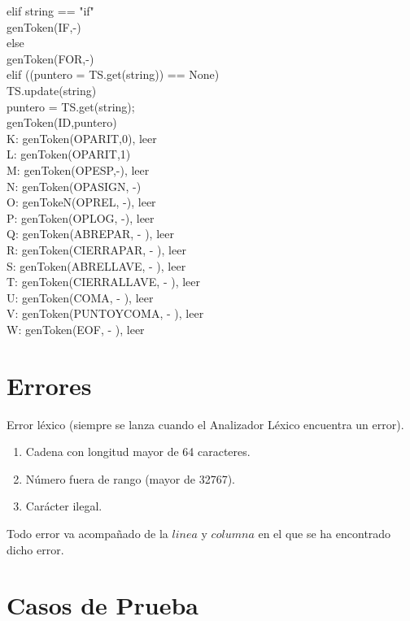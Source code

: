 \documentclass{article}
\begin{document}
\begin{flushleft}
   \qquad     elif string == "if"\\
     \qquad \quad       genToken(IF,-)\\
   \qquad     else\\
      \qquad \quad      genToken(FOR,-)\\
    \quad elif ((puntero = TS.get(string)) == None)\\
         \qquad  TS.update({string})\\
        \qquad    puntero = TS.get(string);\\
         \qquad    genToken(ID,puntero)\\
K: genToken(OPARIT,0), leer\\
L: genToken(OPARIT,1)\\
M: genToken(OPESP,-), leer\\
N: genToken(OPASIGN, -)\\
O: genTokeN(OPREL, -), leer\\
P: genToken(OPLOG, -), leer\\
Q: genToken(ABREPAR, - ), leer\\ 
R: genToken(CIERRAPAR, - ), leer\\
S: genToken(ABRELLAVE, - ), leer\\
T: genToken(CIERRALLAVE, - ), leer\\
U: genToken(COMA, - ), leer\\
V: genToken(PUNTOYCOMA, - ), leer\\
W: genToken(EOF, - ), leer\\
\end{flushleft}
\section{Errores}
Error léxico (siempre se lanza cuando el Analizador Léxico encuentra un error).
\begin{enumerate}
\item Cadena con longitud mayor de 64 caracteres.
\item Número fuera de rango (mayor de 32767).
\item Carácter ilegal. 
\end{enumerate}
Todo error va acompañado de la $linea$ y $columna$ en el que se ha encontrado dicho error.
\clearpage


\section{Casos de Prueba}
\end{document}
